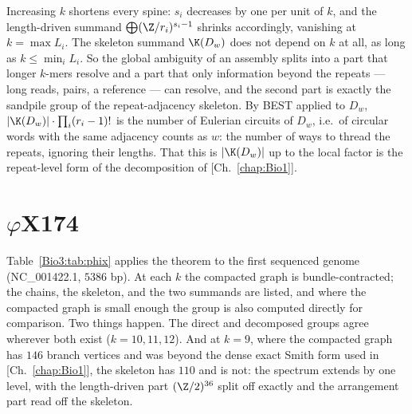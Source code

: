 \begin{remark}\label{Bio3:rem:k}
Increasing $k$ shortens every spine: $s_i$ decreases by one per unit of $k$, and the
length-driven summand $\bigoplus(\Z/r_i)^{s_i-1}$ shrinks accordingly, vanishing at
$k=\max L_i$. The skeleton summand $\K(D_w)$ does not depend on $k$ at all, as long as
$k\le\min_iL_i$. So the global ambiguity of an assembly splits into a part that longer
$k$-mers resolve and a part that only information beyond the repeats --- long reads,
pairs, a reference --- can resolve, and the second part is exactly the sandpile group of
the repeat-adjacency skeleton. By BEST applied to $D_w$, $|\K(D_w)|\cdot\prod_i(r_i-1)!$ is the number
of Eulerian circuits of $D_w$, i.e.\ of circular words with the same adjacency counts as
$w$: the number of ways to thread the repeats, ignoring their lengths. That this is
$|\K(D_w)|$ up to the local factor is the repeat-level form of the decomposition of
[Ch.~\ref{chap:Bio1}].
\end{remark}

\section{$\varphi$X174}\label{Bio3:sec:phix}

Table~\ref{Bio3:tab:phix} applies the theorem to the first sequenced genome (NC\_001422.1,
$5386$ bp). At each $k$ the compacted graph is bundle-contracted; the chains, the
skeleton, and the two summands are listed, and where the compacted graph is small enough
the group is also computed directly for comparison. Two things happen. The direct and
decomposed groups agree wherever both exist ($k=10,11,12$). And at $k=9$, where the
compacted graph has $146$ branch vertices and was beyond the dense exact Smith form used
in [Ch.~\ref{chap:Bio1}], the skeleton has $110$ and is not: the spectrum extends by one level, with
the length-driven part $(\Z/2)^{36}$ split off exactly and the arrangement part read off
the skeleton.


